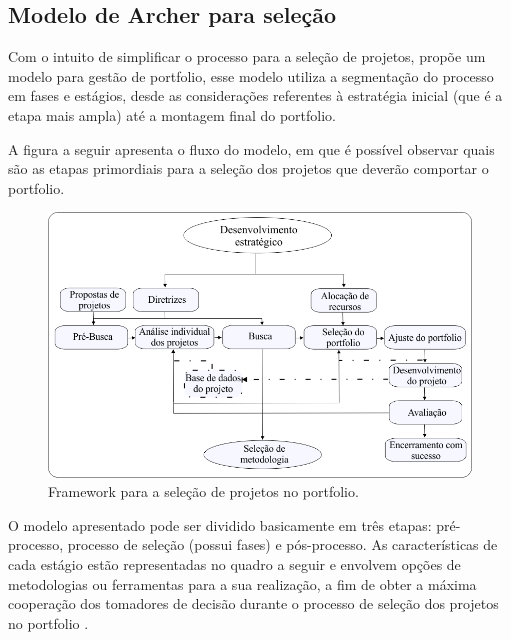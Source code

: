 \documentclass[12pt,a4paper,ruledheader,tocpage=prefix,floatnumber=continuous,pagestart=folhaderosto,font=times]{abnt}
\begin{document}
\subsection{Modelo de Archer para seleção}
Com o intuito de simplificar o processo para a seleção de projetos, \cite{ARCHER1999} propõe um modelo para gestão de portfolio, esse modelo utiliza a 
segmentação do processo em fases e estágios, desde as considerações referentes à estratégia inicial (que é a etapa mais ampla) até a montagem final do 
portfolio.

A figura a seguir apresenta o fluxo do modelo, em que é possível observar quais são as etapas primordiais para a seleção dos projetos que deverão comportar
o portfolio.

\begin{figure}[H]
\centering
\includegraphics[width=.7\textwidth]{img/fig7.png}
\caption{Framework para a seleção de projetos no portfolio\cite{ARCHER1999}.}
\end{figure}

O modelo apresentado pode ser dividido basicamente em três etapas: pré-processo, processo de seleção (possui fases) e pós-processo. As características 
de cada estágio estão representadas no quadro a seguir e envolvem opções de metodologias ou ferramentas para a sua realização, a fim de obter a máxima 
cooperação dos tomadores de decisão durante o processo de seleção dos projetos no portfolio \cite{ARCHER1999}. 
\end{document}
